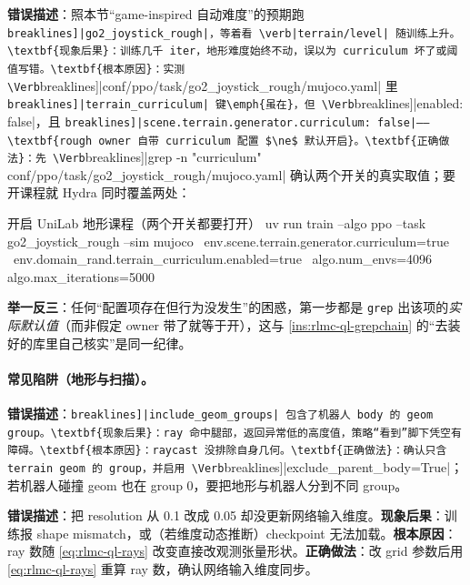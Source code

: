 \begin{pitfall}
\textbf{错误描述}：照本节“game-inspired 自动难度”的预期跑 \Verb[breaklines]|go2_joystick_rough|，等着看 \verb|terrain/level| 随训练上升。\textbf{现象后果}：训练几千 iter，地形难度始终不动，误以为 curriculum 坏了或阈值写错。\textbf{根本原因}：实测 \Verb[breaklines]|conf/ppo/task/go2_joystick_rough/mujoco.yaml| 里 \Verb[breaklines]|terrain_curriculum| 键\emph{虽在}，但 \Verb[breaklines]|enabled: false|，且 \Verb[breaklines]|scene.terrain.generator.curriculum: false|——\textbf{rough owner 自带 curriculum 配置 $\ne$ 默认开启}。\textbf{正确做法}：先 \Verb[breaklines]|grep -n "curriculum" conf/ppo/task/go2_joystick_rough/mujoco.yaml| 确认两个开关的真实取值；要开课程就 Hydra 同时覆盖两处：
\begin{codebox}[bash]{开启 UniLab 地形课程（两个开关都要打开）}
uv run train --algo ppo --task go2_joystick_rough --sim mujoco \
  env.scene.terrain.generator.curriculum=true \
  env.domain_rand.terrain_curriculum.enabled=true \
  algo.num_envs=4096 algo.max_iterations=5000
\end{codebox}
\textbf{举一反三}：任何“配置项存在但行为没发生”的困惑，第一步都是 \verb|grep| 出该项的\emph{实际默认值}（而非假定 owner 带了就等于开），这与 \cref{ins:rlmc-ql-grepchain} 的“去装好的库里自己核实”是同一纪律。
\end{pitfall}

\paragraph{常见陷阱（地形与扫描）。}

\begin{pitfall}
\textbf{错误描述}：\Verb[breaklines]|include_geom_groups| 包含了机器人 body 的 geom group。\textbf{现象后果}：ray 命中腿部，返回异常低的高度值，策略“看到”脚下凭空有障碍。\textbf{根本原因}：raycast 没排除自身几何。\textbf{正确做法}：确认只含 terrain geom 的 group，并启用 \Verb[breaklines]|exclude_parent_body=True|；若机器人碰撞 geom 也在 group 0，要把地形与机器人分到不同 group。
\end{pitfall}

\begin{pitfall}
\textbf{错误描述}：把 resolution 从 0.1 改成 0.05 却没更新网络输入维度。\textbf{现象后果}：训练报 shape mismatch，或（若维度动态推断）checkpoint 无法加载。\textbf{根本原因}：ray 数随 \eqref{eq:rlmc-ql-rays} 改变直接改观测张量形状。\textbf{正确做法}：改 grid 参数后用 \eqref{eq:rlmc-ql-rays} 重算 ray 数，确认网络输入维度同步。
\end{pitfall}

